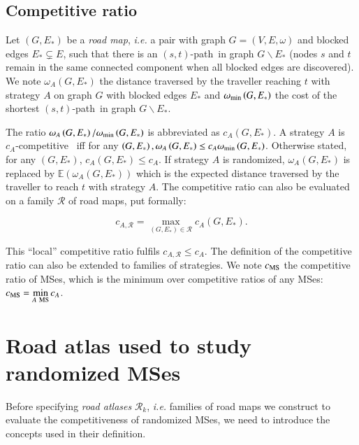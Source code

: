 \documentclass[preprint]{elsarticle}
\newcommand{\stpath}{$(s,t)$-path}
\newcommand{\omegamin}{\omega_{\mbox{\scriptsize{min}}}}
\newcommand{\mcalr}{\mathcal{R}}
\newcommand{\mts}{MS}
\newcommand{\cms}{c_{\mbox{\scriptsize{MS}}}}
\begin{document}
\subsection{Competitive ratio} \label{subsec:compratio}

Let $\left(G,E_*\right)$ be a \textit{road map}, {\em i.e.} a pair with graph $G=\left(V,E,\omega\right)$ and blocked edges $E_* \subsetneq E$, such that there is an \stpath ~in graph $G\backslash E_*$ (nodes $s$ and $t$ remain in the same connected component when all blocked edges are discovered). We note $\omega_A\left(G,E_*\right)$ the distance traversed by the traveller reaching $t$ with strategy $A$ on graph $G$ with blocked edges $E_*$ and $\omegamin\left(G,E_*\right)$ the cost of the shortest \stpath ~in graph $G\backslash E_*$.

The ratio $\omega_A\left(G,E_*\right)/\omegamin\left(G,E_*\right)$ is abbreviated as $c_A\left(G,E_*\right)$. A strategy $A$ is $c_A$-competitive~\cite{BoEl98,XuHuSuZh09} iff for any $\left(G,E_*\right), \omega_A\left(G,E_*\right) \leq c_A \omegamin\left(G,E_*\right)$. Otherwise stated, for any $\left(G,E_*\right)$, $c_A\left(G,E_*\right) \leq c_A$. If strategy $A$ is randomized, $\omega_A\left(G,E_*\right)$ is replaced by $\mathbb{E}\left(\omega_A\left(G,E_*\right)\right)$ which is the expected distance traversed by the traveller to reach $t$ with strategy $A$. The competitive ratio can also be evaluated on a family $\mathcal{R}$ of road maps, put formally:

\begin{equation}
c_{A,\mathcal{R}} = \max\limits_{\left(G,E_*\right) \in \mathcal{R}} c_A\left(G,E_*\right).
\end{equation}

This ``local'' competitive ratio fulfils $c_{A,\mathcal{R}} \le c_A$. The definition of the competitive ratio can also be extended to families of strategies. We note $\cms$ the competitive ratio of \mts es, which is the minimum over competitive ratios of any \mts es: $\cms = \min\limits_{A ~\mbox{\scriptsize{\mts}}} c_A$. 
\section{Road atlas used to study randomized \mts es} \label{sec:roadatlas}

Before specifying \textit{road atlases} $\mcalr_k$, {\em i.e.} families of road maps we construct to evaluate the competitiveness of randomized \mts es, we need to introduce the concepts used in their definition.
\end{document}
